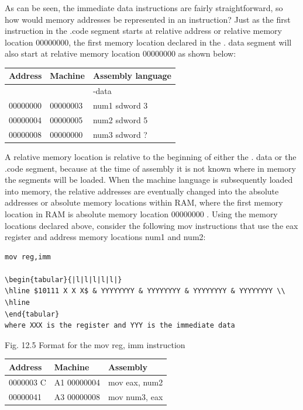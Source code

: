 \documentclass[10pt]{article}
\begin{document}
As can be seen, the immediate data instructions are fairly straightforward, so how would memory addresses be represented in an instruction? Just as the first instruction in the .code segment starts at relative address or relative memory location 00000000, the first memory location declared in the . data segment will also start at relative memory location 00000000 as shown below:

\begin{center}
\begin{tabular}{|l|l|l|}
\hline
Address & Machine & Assembly language \\
\hline
 &  & -data \\
\hline
00000000 & 00000003 & num1 sdword 3 \\
\hline
00000004 & 00000005 & num2 sdword 5 \\
\hline
00000008 & 00000000 & num3 sdword ? \\
\hline
\end{tabular}
\end{center}

A relative memory location is relative to the beginning of either the . data or the .code segment, because at the time of assembly it is not known where in memory the segments will be loaded. When the machine language is subsequently loaded into memory, the relative addresses are eventually changed into the absolute addresses or absolute memory locations within RAM, where the first memory location in RAM is absolute memory location 00000000 . Using the memory locations declared above, consider the following mov instructions that use the eax register and address memory locations num1 and num2:

\begin{verbatim}
mov reg,imm

\begin{tabular}{|l|l|l|l|l|}
\hline $10111 X X X$ & YYYYYYYY & YYYYYYYY & YYYYYYYY & YYYYYYYY \\
\hline
\end{tabular}
where XXX is the register and YYY is the immediate data
\end{verbatim}

Fig. 12.5 Format for the mov reg, imm instruction

\begin{center}
\begin{tabular}{|l|l|l|}
\hline
Address & Machine & Assembly \\
\hline
0000003 C & A1 00000004 & mov eax, num2 \\
\hline
00000041 & A3 00000008 & mov num3, eax \\
\hline
\end{tabular}
\end{center}
\end{document}
